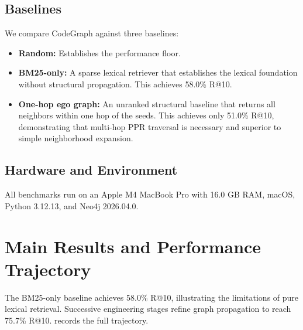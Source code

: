 \subsection{Baselines}
\label{sec:eval-baselines}

We compare CodeGraph against three baselines:
\begin{itemize}
    \item \textbf{Random:} Establishes the performance floor.
    \item \textbf{BM25-only:} A sparse lexical retriever that establishes the lexical foundation without structural propagation. This achieves 58.0\% R@10.
    \item \textbf{One-hop ego graph:} An unranked structural baseline that returns all neighbors within one hop of the seeds. This achieves only 51.0\% R@10, demonstrating that multi-hop PPR traversal is necessary and superior to simple neighborhood expansion.
\end{itemize}

\subsection{Hardware and Environment}
All benchmarks run on an Apple M4 MacBook Pro with 16.0 GB RAM, macOS, Python 3.12.13, and Neo4j 2026.04.0.

\section{Main Results and Performance Trajectory}
\label{sec:eval-trajectory}

The BM25-only baseline achieves 58.0\% R@10, illustrating the limitations of pure lexical retrieval. Successive engineering stages refine graph propagation to reach 75.7\% R@10.  records the full trajectory.

